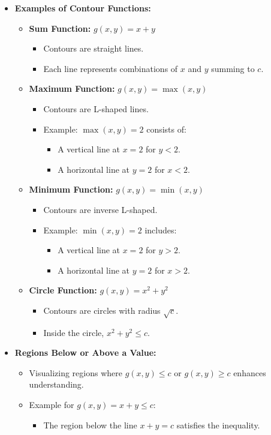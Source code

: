 \documentclass{article}
\begin{document}
\begin{itemize}
  \item \textbf{Examples of Contour Functions:}
    \begin{itemize}
      \item \textbf{Sum Function:} $g(x, y) = x + y$
        \begin{itemize}
          \item Contours are straight lines.
          \item Each line represents combinations of $x$ and $y$ summing to $c$.
        \end{itemize}
      \item \textbf{Maximum Function:} $g(x, y) = \max(x, y)$
        \begin{itemize}
          \item Contours are L-shaped lines.
          \item Example: $\max(x, y) = 2$ consists of:
            \begin{itemize}
              \item A vertical line at $x = 2$ for $y < 2$.
              \item A horizontal line at $y = 2$ for $x < 2$.
            \end{itemize}
        \end{itemize}
      \item \textbf{Minimum Function:} $g(x, y) = \min(x, y)$
        \begin{itemize}
          \item Contours are inverse L-shaped.
          \item Example: $\min(x, y) = 2$ includes:
            \begin{itemize}
              \item A vertical line at $x = 2$ for $y > 2$.
              \item A horizontal line at $y = 2$ for $x > 2$.
            \end{itemize}
        \end{itemize}
      \item \textbf{Circle Function:} $g(x, y) = x^2 + y^2$
        \begin{itemize}
          \item Contours are circles with radius $\sqrt{c}$.
          \item Inside the circle, $x^2 + y^2 \leq c$.
        \end{itemize}
    \end{itemize}

  \item \textbf{Regions Below or Above a Value:}
    \begin{itemize}
      \item Visualizing regions where $g(x, y) \leq c$ or $g(x, y) \geq c$ enhances understanding.
      \item Example for $g(x, y) = x + y \leq c$:
        \begin{itemize}
          \item The region below the line $x + y = c$ satisfies the inequality.
        \end{itemize}
    \end{itemize}


\end{itemize}
\end{document}
